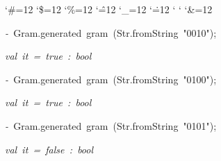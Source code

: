 \begin{list}{}
{\setlength{\leftmargin}{\leftmargini}
\setlength{\rightmargin}{0cm}
\setlength{\itemindent}{0cm}
\setlength{\listparindent}{0cm}
\setlength{\itemsep}{0cm}
\setlength{\parsep}{0cm}
\setlength{\labelsep}{0cm}
\setlength{\labelwidth}{0cm}
\catcode`\#=12
\catcode`\$=12
\catcode`\%=12
\catcode`\^=12
\catcode`\_=12
\catcode`\.=12
\catcode`
\catcode`
\catcode`\&=12
\ttfamily}
\small
\item[]\textsl{-\ }Gram.generated\ gram\ (Str.fromString\ "0010");
\item[]\textsl{val\ it\ =\ true\ :\ bool}
\item[]\textsl{-\ }Gram.generated\ gram\ (Str.fromString\ "0100");
\item[]\textsl{val\ it\ =\ true\ :\ bool}
\item[]\textsl{-\ }Gram.generated\ gram\ (Str.fromString\ "0101");
\item[]\textsl{val\ it\ =\ false\ :\ bool}
\end{list}
